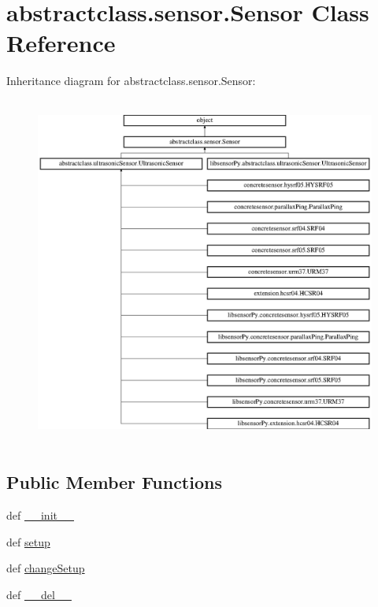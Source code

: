 \hypertarget{classabstractclass_1_1sensor_1_1Sensor}{}\section{abstractclass.\+sensor.\+Sensor Class Reference}
\label{classabstractclass_1_1sensor_1_1Sensor}
Inheritance diagram for abstractclass.\+sensor.\+Sensor\+:\begin{figure}[H]
\begin{center}
\leavevmode
\includegraphics[height=11.570248cm]{classabstractclass_1_1sensor_1_1Sensor}
\end{center}
\end{figure}
\subsection*{Public Member Functions}
\begin{DoxyCompactItemize}
\item 
def \hyperlink{classabstractclass_1_1sensor_1_1Sensor_ab53efa3e6f6484e10b705ab9d03bd39a}{\+\_\+\+\_\+init\+\_\+\+\_\+}
\item 
def \hyperlink{classabstractclass_1_1sensor_1_1Sensor_ac39a479cd9e8b0b58c0efae91211057e}{setup}
\item 
def \hyperlink{classabstractclass_1_1sensor_1_1Sensor_a9877913d095b06a114aa7290c1e866ac}{change\+Setup}
\item 
def \hyperlink{classabstractclass_1_1sensor_1_1Sensor_ac61cdd3c37afa155ef3d3ef886062111}{\+\_\+\+\_\+del\+\_\+\+\_\+}
\end{DoxyCompactItemize}

